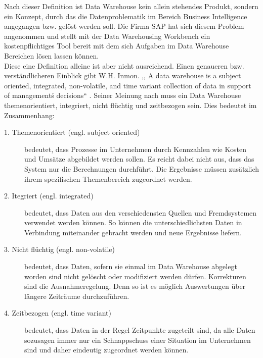 Nach dieser Definition ist Data Warehouse kein allein stehendes Produkt, sondern ein Konzept, durch das die Datenproblematik im Bereich Business Intelligence  angegangen bzw. gelöst werden soll. Die Firma SAP hat sich diesem Problem angenommen und stellt mit der Data Warehousing Workbench ein kostenpflichtiges Tool bereit mit dem sich Aufgaben im Data Warehouse Bereichen lösen lassen können.  \\
Diese eine Definition alleine ist aber nicht ausreichend. Einen genaueren bzw. verständlicheren Einblick gibt W.H. Inmon. ,, A data warehouse is a subject oriented, integrated, non-volatile, and time variant collection of data in support of management\'s decisions`` \cite[S. 33]{Inmon:2005vg}. Seiner Meinung nach muss ein Data Warehouse themenorientiert, integriert, nicht flüchtig und zeitbezogen sein. Dies bedeutet im Zusammenhang: \\
\begin{description}
	\item [1. Themenorientiert (engl. subject oriented)] bedeutet, dass Prozesse im Unternehmen durch Kennzahlen wie Kosten und Umsätze abgebildet werden sollen. Es reicht dabei nicht aus, dass das System nur die Berechnungen durchführt. Die Ergebnisse müssen zusätzlich ihrem spezifischen Themenbereich zugeordnet werden. 
	\item [2. Itegriert (engl. integrated)] bedeutet, dass Daten aus den verschiedensten Quellen und Fremdsystemen verwendet werden können. So können die unterschiedlichsten Daten in Verbindung miteinander gebracht werden und neue Ergebnisse liefern.
	\item [3. Nicht flüchtig (engl. non-volatile)]bedeutet, dass Daten, sofern sie einmal im Data Warehouse abgelegt worden sind nicht gelöscht oder modifiziert werden dürfen. Korrekturen sind die Ausnahmeregelung. Denn so ist es möglich Auswertungen über längere Zeiträume durchzuführen.
	\item [4. Zeitbezogen (engl. time variant)] bedeutet, dass Daten in der Regel Zeitpunkte zugeteilt sind, da alle Daten sozusagen immer nur ein Schnappschuss einer Situation im Unternehmen sind und daher eindeutig zugeordnet werden können.
\end{description}





